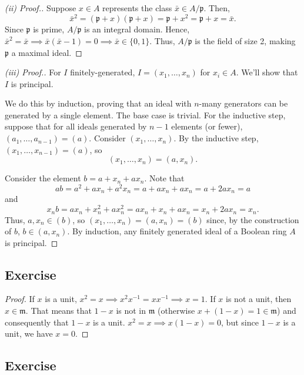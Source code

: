\begin{proof}[(ii) Proof.]
Suppose $x \in A$ represents the class $\bar{x} \in A / \mathfrak{p}$. Then, 
\[ \bar{x}^2 = (\mathfrak{p} + x)(\mathfrak{p} + x) = \mathfrak{p} + x^2 = \mathfrak{p} + x = \bar{x}. \] 
Since $\mathfrak{p}$ is prime, $A / \mathfrak{p}$ is an integral domain. Hence, $\bar{x}^2 = \bar{x} \implies \bar{x} (\bar{x} - 1) = 0 \implies \bar{x} \in \{0, 1\}$. Thus, $A / \mathfrak{p}$ is the field of size 2, making $\mathfrak{p}$ a maximal ideal.
\end{proof}

\begin{proof}[(iii) Proof.]
For $I$ finitely-generated, $I = (x_1,\ldots,x_n)$ for $x_i \in A$. We'll show that $I$ is principal.

We do this by induction, proving that an ideal with $n$-many generators can be generated by a single element. The base case is trivial. For the inductive step,
suppose that for all ideals generated by $n-1$ elements (or fewer), $(a_1,\ldots,a_{n-1}) = (a)$. Consider $(x_1,\ldots,x_n)$. By the inductive step,
$(x_1,\ldots,x_{n-1}) = (a)$, so 
$$(x_1,\ldots,x_n) = (a, x_n).$$

Consider the element $b = a + x_n + ax_n$. Note that 
$$ab = a^2 + ax_n + a^2x_n = a + ax_n + ax_n = a + 2ax_n = a$$
and
$$x_n b = a x_n + x_n^2 + a x_n^2 = a x_n + x_n + a x_n = x_n + 2 a x_n = x_n.$$
Thus, $a, x_n \in (b)$, so $(x_1,\ldots,x_n) = (a, x_n) = (b)$ since, by the construction of $b$, $b \in (a, x_n)$. By induction, any finitely generated
ideal of a Boolean ring $A$ is principal.
\end{proof}

\subsection{Exercise}\label{1.12}

\begin{proof}
If $x$ is a unit, $x^2 = x \implies x^2 x^{-1} = x x^{-1} \implies x = 1$. If $x$ is not a unit, then $x \in \mathfrak{m}$. That means that $1 - x$ is not 
in $\mathfrak{m}$ (otherwise $x + (1-x) = 1 \in \mathfrak{m}$) and consequently that $1 - x$ is a unit. $x^2 = x \implies x (1 - x) = 0$, but since 
$1 - x$ is a unit, we have $x = 0$.
\end{proof}

\subsection{Exercise}\label{1.13}


